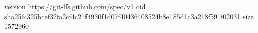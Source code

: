 version https://git-lfs.github.com/spec/v1
oid sha256:325bcef32fa2cf4c21f4930f1d07f40436408524b8e185d1c3a218f591f02031
size 1572960
